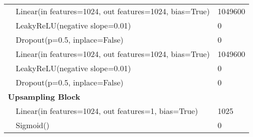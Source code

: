 \begin{center}
\begin{tabular}{ p{} p{}  p{}}
                                                      & Linear(in features=1024, out features=1024, bias=True) & 1049600             \\
                                                      & LeakyReLU(negative slope=0.01)                         & 0                   \\
                                                      & Dropout(p=0.5, inplace=False)                          & 0                   \\
                                                      & Linear(in features=1024, out features=1024, bias=True) & 1049600             \\
                                                      & LeakyReLU(negative slope=0.01)                         & 0                   \\
                                                      & Dropout(p=0.5, inplace=False)                          & 0                   \\

        \multicolumn{2}{l}{\textbf{Upsampling Block}} &                                                                              \\
                                                      & Linear(in features=1024, out features=1, bias=True)    & 1025                \\
                                                      & Sigmoid()                                              & 0                   \\
    \end{tabular}
\end{center}